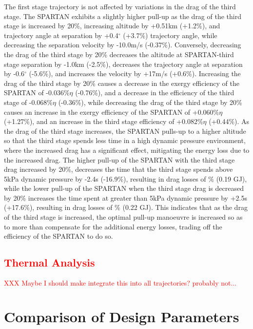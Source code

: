 The first stage trajectory is not affected by variations in the drag of the third stage. 
The SPARTAN exhibits a slightly higher pull-up as the drag of the third stage is increased by 20\%, increasing altitude by +0.51km (+1.2\%), and trajectory angle at separation by +0.4$^\circ$ (+3.7\%) trajectory angle, while decreasing the separation velocity by -10.0m/s (-0.37\%). Conversely, decreasing the drag of the third stage by 20\% decreases the altitude at SPARTAN-third stage separation by -1.0km (-2.5\%), decreases the trajectory angle at separation by -0.6$^\circ$ (-5.6\%), and increases the velocity by +17m/s (+0.6\%). 
Increasing the drag of the third stage by 20\% causes a decrease in the exergy efficiency of the SPARTAN of -0.036\%$\eta$ (-0.76\%), and a decrease in the efficiency of the third stage of -0.068\%$\eta$ (-0.36\%), while decreasing the drag of the third stage by 20\% causes an increase in the exergy efficiency of the SPARTAN of +0.060\%$\eta$ (+1.27\%), and an increase in the third stage efficiency of +0.082\%$\eta$ (+0.44\%). 
As the drag of the third stage increases, the SPARTAN pulls-up to a higher altitude so that the third stage spends less time in a high dynamic pressure environment, where the increased drag has a significant effect, mitigating the energy loss due to the increased drag. The higher pull-up of the SPARTAN with the third stage drag increased by 20\%, decreases the time that the third stage spends above 5kPa dynamic pressure by -2.4s (-16.9\%), resulting in drag losses of \WDthreeCdThreeOneHundredTwentyNoReturn\% (0.19 GJ), while the lower pull-up of the SPARTAN when the third stage drag is decreased by 20\% increases the time spent at greater than 5kPa dynamic pressure by +2.5s (+17.6\%), resulting in drag losses of \WDthreeCdThreeEightyNoReturn\% (0.22 GJ). This indicates that as the drag of the third stage is increased, the optimal pull-up manoeuvre is increased so as to more than compensate for the additional energy losses, trading off the efficiency of the SPARTAN to do so. 

\textcolor{red}{\subsection{Thermal Analysis} XXX Maybe I should make integrate this into all trajectories? probably not...}

\section{Comparison of Design Parameters}\label{sec:comparisonNoReturn}

